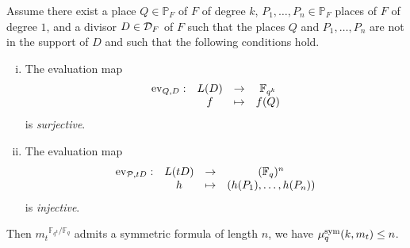 \documentclass[11pt]{article}
\begin{document}
\begin{prop}
  \label{prop:method}
  Assume there exist a place $Q\in\mathbb{P}_{F}$ of $F$ of degree $k$, $P_1,
  \dots, P_n\in\mathbb{P}_F$ places of $F$ of degree $1$, and a divisor
  $D\in\mathcal{D}_F$ of $F$ such that the places $Q$ and $P_1, \dots, P_n$ are not in
  the support of $D$ and such that the following conditions hold.
  \begin{enumerate}[(i)]
    \item \label{cond:1} The evaluation map
      \[
        \begin{array}{cccc}
        \operatorname{ev}_{Q, D}: & L(D) & \to & \mathbb{F}_{q^k}\\
  & f & \mapsto & f(Q)
\end{array}
\]
is \emph{surjective}.
    \item \label{cond:2} The evaluation map
      \[
        \begin{array}{cccc}
        \operatorname{ev}_{\mathcal{P}, tD}: & L(tD) & \to & (\mathbb{F}_{q})^n\\
  & h & \mapsto & (h(P_1), \dots, h(P_n))
\end{array}
\]
is \emph{injective}.
  \end{enumerate}
  Then ${m_t}^{\mathbb{F}_{q^k}/\mathbb{F}_q}$ admits a symmetric formula of length $n$, \ie we have $\mu^{\textrm{sym}}_q(k,m_t)\leq n$.
\end{prop}
\end{document}
